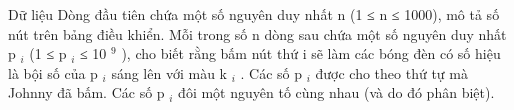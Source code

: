 Dữ liệu
Dòng đầu tiên chứa một số nguyên duy nhất n (1 ≤ n ≤ 1000), mô tả số nút trên bảng điều khiển. Mỗi trong số n dòng sau chứa một số nguyên duy nhất p   $_    i   $   (1 ≤ p   $_    i   $   ≤ 10   $^    9   $   ), cho biết rằng bấm nút thứ i sẽ làm các bóng đèn có số hiệu là bội số của p   $_    i   $   sáng lên với màu k   $_    i   $   . Các số p   $_    i   $   được cho theo thứ tự mà Johnny đã bấm. Các số p   $_    i   $   đôi một nguyên tố cùng nhau (và do đó phân biệt).